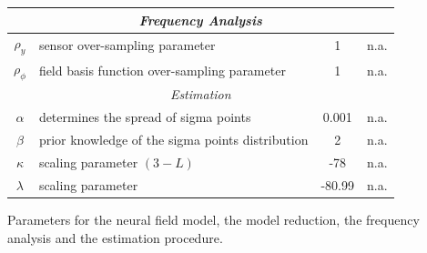 \documentclass[12pt]{iopart}
\begin{document}
\begin{table}[!ht]
\begin{tabular}{|c|l|c|l|}
	\hline 
	\multicolumn{4}{|c|}{\emph{Frequency Analysis}}\\
	\hline
	$\rho_y$ & sensor over-sampling parameter & 1 & n.a.\\
	$\rho_\phi$ & field basis function over-sampling parameter & 1 & n.a.\\
	\hline 
	\multicolumn{4}{|c|}{\emph{Estimation}}\\
	\hline
	$\alpha$& determines the spread of sigma points & 0.001 & n.a.\\
	$\beta$& prior knowledge of the sigma points distribution & 2 & n.a.\\
	$\kappa$& scaling parameter $(3-L)$& -78 & n.a.\\
	$\lambda$& scaling parameter & -80.99 & n.a.\\
	\hline
\end{tabular}
\begin{flushleft}Parameters for the neural field model, the model reduction, the frequency analysis and the estimation procedure.
\end{flushleft}
\label{tab:Parameters}
\end{table}
	

\end{document}
